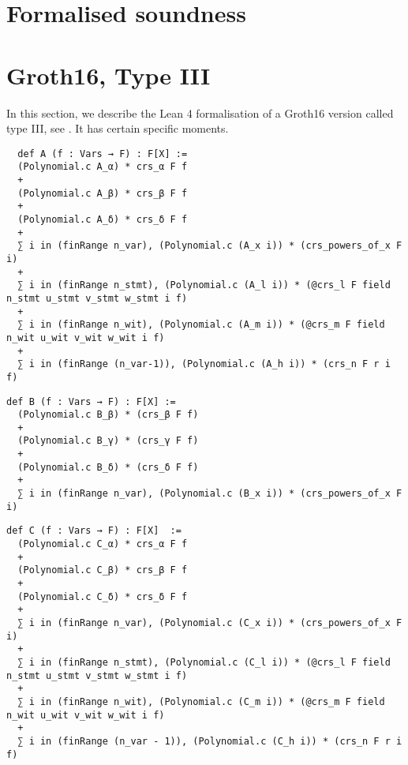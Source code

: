 \documentclass{article}
\theoremstyle{definition}
\theoremstyle{remark}
\begin{document}
\section{Formalised soundness}

\section{Groth16, Type III}

In this section, we describe the Lean 4 formalisation of a Groth16 version called type III, see \cite{baghery2021another}. It has certain specific moments.

\begin{lstlisting}
  def A (f : Vars → F) : F[X] :=
  (Polynomial.c A_α) * crs_α F f
  +
  (Polynomial.c A_β) * crs_β F f
  +
  (Polynomial.c A_δ) * crs_δ F f
  +
  ∑ i in (finRange n_var), (Polynomial.c (A_x i)) * (crs_powers_of_x F i)
  +
  ∑ i in (finRange n_stmt), (Polynomial.c (A_l i)) * (@crs_l F field n_stmt u_stmt v_stmt w_stmt i f)
  +
  ∑ i in (finRange n_wit), (Polynomial.c (A_m i)) * (@crs_m F field n_wit u_wit v_wit w_wit i f)
  +
  ∑ i in (finRange (n_var-1)), (Polynomial.c (A_h i)) * (crs_n F r i f)
\end{lstlisting}

\begin{lstlisting}
def B (f : Vars → F) : F[X] :=
  (Polynomial.c B_β) * (crs_β F f)
  +
  (Polynomial.c B_γ) * (crs_γ F f)
  +
  (Polynomial.c B_δ) * (crs_δ F f)
  +
  ∑ i in (finRange n_var), (Polynomial.c (B_x i)) * (crs_powers_of_x F i)
\end{lstlisting}

\begin{lstlisting}
def C (f : Vars → F) : F[X]  :=
  (Polynomial.c C_α) * crs_α F f
  +
  (Polynomial.c C_β) * crs_β F f
  +
  (Polynomial.c C_δ) * crs_δ F f
  +
  ∑ i in (finRange n_var), (Polynomial.c (C_x i)) * (crs_powers_of_x F i)
  +
  ∑ i in (finRange n_stmt), (Polynomial.c (C_l i)) * (@crs_l F field n_stmt u_stmt v_stmt w_stmt i f)
  +
  ∑ i in (finRange n_wit), (Polynomial.c (C_m i)) * (@crs_m F field n_wit u_wit v_wit w_wit i f)
  +
  ∑ i in (finRange (n_var - 1)), (Polynomial.c (C_h i)) * (crs_n F r i f)
\end{lstlisting}



\end{document}
